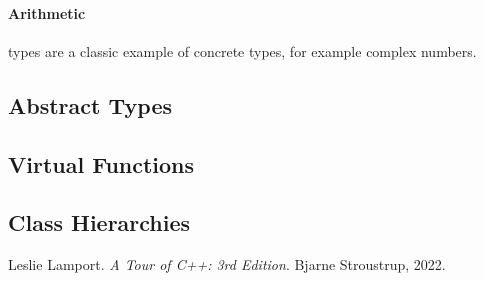 \documentclass[a4paper, 10pt]{article}
\begin{document}
\paragraph{Arithmetic} types are a classic example of concrete types, for example complex numbers.
\subsection{Abstract Types}
\subsection{Virtual Functions}
\subsection{Class Hierarchies}

\begin{thebibliography}{9}
	Leslie Lamport.
	\textit{A Tour of C++: 3rd Edition}.
	Bjarne Stroustrup, 2022.

\end{thebibliography}
\end{document}
